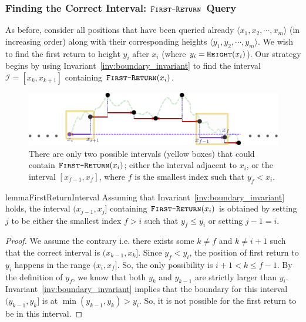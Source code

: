 \subsubsection{Finding the Correct Interval: $\texttt{\textsc{First-Return}}$ Query}
\label{sec:finding_the_correct_interval}
As before, consider all positions that have been queried already $ \langle x_1, x_2,\cdots, x_m \rangle$ (in increasing order)
along with their corresponding heights $ \langle y_1, y_2,\cdots, y_m \rangle$.
We wish to find the first return to height $y_i$ after $x_i$ (where $y_i = \texttt{\textsc{Height}}(x_i)$).
Our strategy begins by using Invariant~\ref{inv:boundary_invariant} to find the interval $\mathcal I = [x_k, x_{k+1}]$
containing $\texttt{\textsc{First-Return}}(x_i)$.
\begin{figure}[htpb]
    \centering
    \includegraphics[width=\textwidth]{images/dyck_finding_correct_interval.pdf}
    \caption{There are only two possible intervals (yellow boxes) that could contain $\texttt{\textsc{First-Return}}(x_i)$;
    either the interval adjacent to $x_i$, or the interval $[x_{f-1}, x_f]$, where $f$ is the smallest index such that $y_f < x_i$.
    }
    \label{fig:dyck_finding_correct_interval}
\end{figure}
\begin{restatable}{lemma}{FirstReturnInterval}
\label{lem:first_return_interval}
Assuming that Invariant~\ref{inv:boundary_invariant} holds, the interval $(x_{j-1},x_{j}]$ containing $\texttt{\textsc{First-Return}}(x_i)$
is obtained by setting $j$ to be either the smallest index $f>i$ such that $y_f\le y_i$ or setting $j-1=i$.
\end{restatable}
\begin{proof}
We assume the contrary i.e. there exists some $k\not=f$ and $k\not=i+1$ such that the correct interval is $(x_{k-1},x_k]$.
Since $y_f<y_i$, the position of first return to $y_i$ happens in the range $(x_i,x_f]$.
So, the only possibility is $i+1 < k \le f-1$.
By the definition of $y_f$, we know that both $y_k$ and $y_{k-1}$ are strictly larger than $y_i$.
Invariant~\ref{inv:boundary_invariant} implies that the boundary for this interval $(y_{k-1},y_k]$ is at $\min(y_{k-1},y_k) > y_i$.
So, it is not possible for the first return to be in this interval.
\end{proof}

